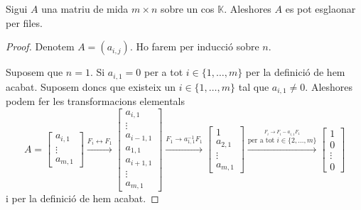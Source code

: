\documentclass[../../Main.tex]{subfiles}
\begin{document}
	\begin{proposition}
		\label{prop:es pot esglaonar qualsevol matriu per files}
		Sigui \(A\) una matriu de mida \(m\times n\) sobre un cos \(\mathbb{K}\). Aleshores \(A\) es pot esglaonar per files.
		\begin{proof} %
			Denotem \(A=(a_{i,j})\). Ho farem per inducció sobre \(n\).
			
			Suposem que \(n=1\). Si \(a_{i,1}=0\) per a tot \(i\in\{1,\dots,m\}\) per la definició de  hem acabat. Suposem doncs que existeix un \(i\in\{1,\dots,m\}\) tal que \(a_{i,1}\neq0\). Aleshores podem fer les transformacions elementals
			\[A=
			\left[\begin{matrix}
			a_{i,1}\\
			\vdots\\
			a_{m,1}
			\end{matrix}\right]
			\overset{F_{i}\leftrightarrow F_{1}}{\longrightarrow}
			\left[\begin{matrix}
			a_{i,1}\\
			\vdots\\
			a_{i-1,1}\\
			a_{1,1}\\
			a_{i+1,1}\\
			\vdots\\
			a_{m,1}
			\end{matrix}\right]
			\overset{F_{1}\rightarrow a_{1,1}^{-1}F_{1}}{\longrightarrow}
			\left[\begin{matrix}
			1\\
			a_{2,1}\\
			\vdots\\
			a_{m,1}
			\end{matrix}\right]
			\overset{\overset{F_{i}\rightarrow F_{i}-a_{i,1}F_{1}}{\text{per a tot }i\in\{2,\dots,m\}}}{\longrightarrow}
			\left[\begin{matrix}
			1\\
			0\\
			\vdots\\
			0
			\end{matrix}\right]\]
			i per la definició de  hem acabat.
			

\end{proof}
\end{proposition}
\end{document}
